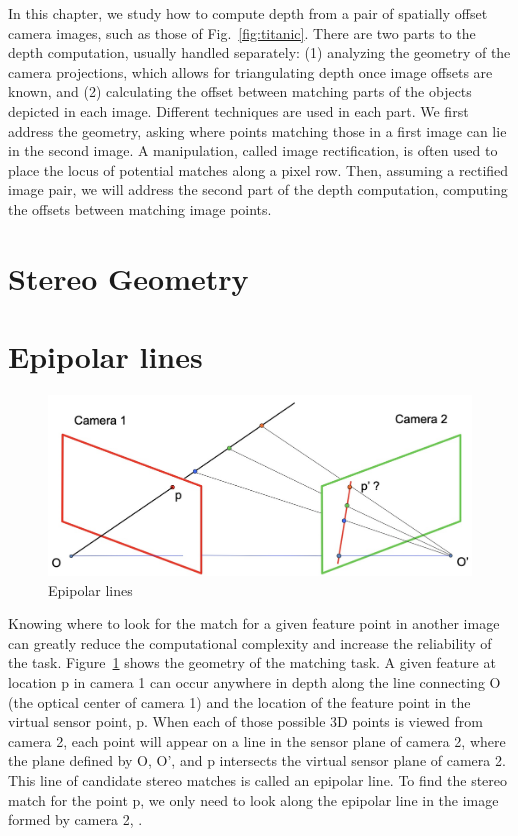 In this chapter, we study how to compute depth from a pair of spatially offset camera images, such as those of Fig.~\ref{fig:titanic}.  There are two parts to the depth computation, usually handled separately:  (1) analyzing the geometry of the camera projections, which allows for triangulating depth once image offsets are known, and (2) calculating the offset between matching parts of the objects depicted in each image.  Different techniques are used in each part.  We first address the geometry, asking where points matching those in a first image can lie in the second image. A manipulation, called image rectification, is often used to place the locus of potential matches along a pixel row.  Then, assuming a rectified image pair, we will address the second part of the depth computation, computing the offsets between matching image points.

\section{Stereo Geometry}

\section{Epipolar lines}
\label{sect:epipolar}
\begin{figure}
    \centerline{
        \includegraphics[width=0.8\linewidth]{figures/stereo/epipolar.jpg}
    }
    \caption{Epipolar lines}
    \label{fig:epipolar}
\end{figure}

Knowing where to look for the match for a given feature point in another image can greatly reduce the computational complexity and increase the reliability of the task.  Figure~\ref{fig:epipolar} shows the geometry of the matching task.  A given feature at location p in camera 1 can occur anywhere in depth along the line connecting O (the optical center of camera 1) and the location of the feature point in the virtual sensor point, p.  When each of those possible 3D points is viewed from camera 2, each point will appear on a line in the sensor plane of camera 2, where the plane defined by O, O', and p  intersects the virtual sensor plane of camera 2. This line of candidate stereo matches
is called an epipolar line.   To find the stereo match for the point p, we only need to look along the  epipolar line in the image formed by camera 2, \cite{Hartley2004}.

